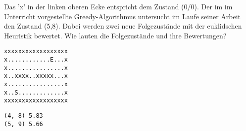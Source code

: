 \question[2]
Das 'x' in der linken oberen Ecke entspricht dem Zustand (0/0). Der im
im Unterricht vorgestellte Greedy-Algorithmus untersucht im Laufe seiner
Arbeit den Zustand (5,8). Dabei werden zwei neue Folgezustände
mit der euklidschen Heuristik bewertet. Wie lauten die Folgezustände und
ihre Bewertungen?
\begin{lstlisting}
xxxxxxxxxxxxxxxxxx
x............E...x
x................x
x..xxxx..xxxxx...x
x................x
x..S.............x
xxxxxxxxxxxxxxxxxx
\end{lstlisting}
\begin{solutionbox}{4cm}
\begin{lstlisting}
(4, 8) 5.83
(5, 9) 5.66
\end{lstlisting}
\end{solutionbox}

